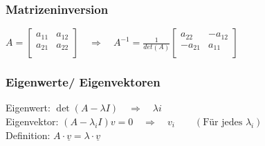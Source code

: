 	
	\begin{minipage}[t]{9.5cm}
		\subsubsection{Matrizeninversion}
			$A=\begin{bmatrix}
						a_{11}&a_{12}\\
						a_{21}&a_{22}\\
				\end{bmatrix}\quad\Rightarrow\quad
			A^{-1}=\frac{1}{det(A)}
			\begin{bmatrix}
				a_{22}&-a_{12}\\
				-a_{21}&a_{11}\\
			\end{bmatrix}$
	\end{minipage}
	\hfill
	\begin{minipage}[t]{9.5cm}
		\subsubsection{Eigenwerte/ Eigenvektoren}
			Eigenwert: $\det(A-\lambda I)\quad\Rightarrow\quad \lambda i$\\
			Eigenvektor: $(A-\lambda_i I)v=0\quad\Rightarrow\quad v_i\qquad(\text{Für jedes }\lambda_i)$\\
			Definition: $ A\cdot \underline{v} = \lambda \cdot \underline{v} $
	\end{minipage}
	

